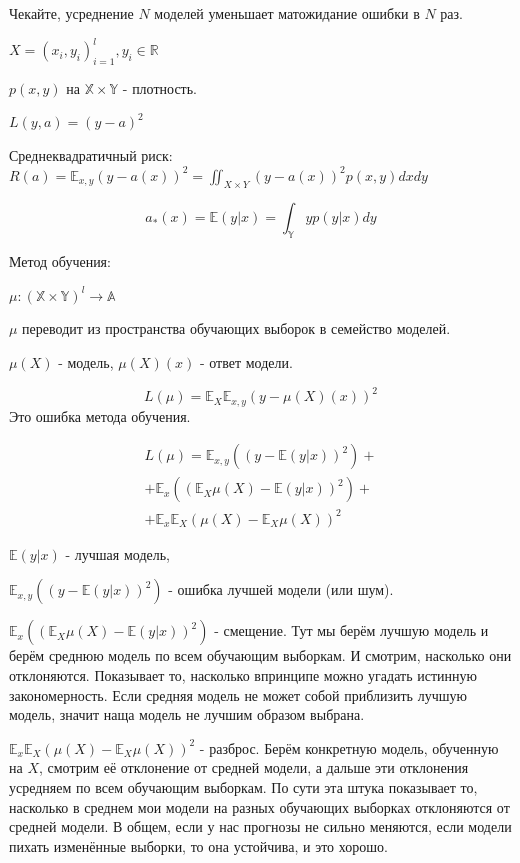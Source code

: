 \documentclass[12pt]{article}
\begin{document}
\begin{itemize}
Чекайте, усреднение $N$ моделей уменьшает матожидание ошибки в $N$ раз.

$X = (x_i, y_i)_{i=1}^l, y_i \in \mathbb{R}$

$p(x, y)$ на $\mathbb{X} \times \mathbb{Y}$ - плотность.

$L(y, a) = (y-a)^2$

Среднеквадратичный риск: $R(a) = \mathbb{E}_{x, y} (y-a(x))^2 = \iint_{X \times Y} (y-a(x))^2 p(x, y) dxdy$

\[ a_*(x) = \mathbb{E} (y|x) = \int_\mathbb{Y} yp(y|x) dy \]

Метод обучения:

$\mu: (\mathbb{X} \times \mathbb{Y})^l \rightarrow \mathbb{A}$

$\mu$ переводит из пространства обучающих выборок в семейство моделей.

$\mu(X)$ - модель, $\mu(X)(x)$ - ответ модели.

\[ L(\mu) = \mathbb{E}_X \mathbb{E}_{x, y} (y - \mu(X)(x))^2 \]
Это ошибка метода обучения.

\begin{equation}
\begin{gathered}
L(\mu) = \mathbb{E}_{x, y} \left( \left( y - \mathbb{E}(y|x) \right)^2 \right) + \\
+ \mathbb{E}_x \left( \left(\mathbb{E}_X \mu(X) - \mathbb{E} (y|x) \right)^2 \right) + \\
+ \mathbb{E}_x \mathbb{E}_X \left( \mu(X) - \mathbb{E}_X \mu(X) \right)^2
\end{gathered}
\end{equation}

$\mathbb{E}(y|x)$ - лучшая модель,

$\mathbb{E}_{x, y} \left( \left( y - \mathbb{E}(y|x) \right)^2 \right)$ - ошибка лучшей модели (или шум).

$\mathbb{E}_x \left( \left(\mathbb{E}_X \mu(X) - \mathbb{E} (y|x) \right)^2 \right)$ - смещение. Тут мы берём лучшую модель и берём среднюю модель по всем обучающим выборкам. И смотрим, насколько они отклоняются. Показывает то, насколько впринципе можно угадать истинную закономерность. Если средняя модель не может собой приблизить лучшую модель, значит наща модель не лучшим образом выбрана.

$\mathbb{E}_x \mathbb{E}_X \left( \mu(X) - \mathbb{E}_X \mu(X) \right)^2$ - разброс. Берём конкретную модель, обученную на $X$, смотрим её отклонение от средней модели, а дальше эти отклонения усредняем по всем обучающим выборкам. По сути эта штука показывает то, насколько в среднем мои модели на разных обучающих выборках отклоняются от средней модели. В общем, если у нас прогнозы не сильно меняются, если модели пихать изменённые выборки, то она устойчива, и это хорошо.


\end{itemize}
\end{document}
